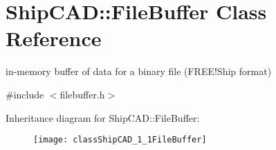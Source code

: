 \hypertarget{classShipCAD_1_1FileBuffer}{}\section{Ship\+C\+AD\+:\+:File\+Buffer Class Reference}
\label{classShipCAD_1_1FileBuffer}


in-\/memory buffer of data for a binary file (F\+R\+E\+E!\+Ship format)  




{\ttfamily \#include $<$filebuffer.\+h$>$}

Inheritance diagram for Ship\+C\+AD\+:\+:File\+Buffer\+:\begin{figure}[H]
\begin{center}
\leavevmode
\texttt{[image: classShipCAD\_1\_1FileBuffer]}
\end{center}
\end{figure}
